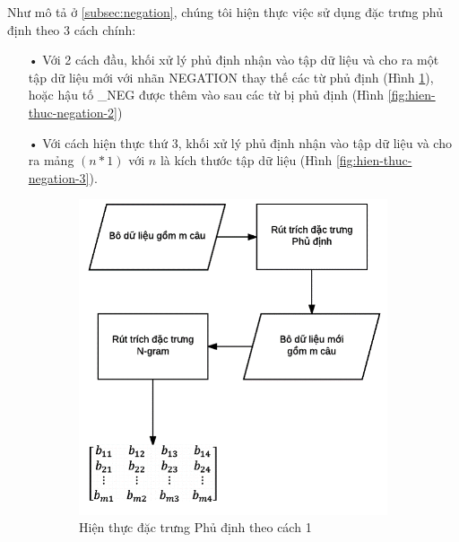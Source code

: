 Như mô tả ở \ref{subsec:negation}, chúng tôi hiện thực việc sử dụng đặc trưng phủ định theo 3 cách chính:
\begin{itemize}
\item[•] Với 2 cách đầu, khối xử lý phủ định nhận vào tập dữ liệu và cho ra một tập dữ liệu mới với nhãn NEGATION thay thế các từ phủ định (Hình \ref{fig:hien-thuc-negation-1}), hoặc hậu tố \_NEG được thêm vào sau các từ bị phủ định (Hình \ref{fig:hien-thuc-negation-2})
\item[•] Với cách hiện thực thứ 3, khối xử lý phủ định nhận vào tập dữ liệu và cho ra mảng $(n*1)$ với $n$ là kích thước tập dữ liệu (Hình \ref{fig:hien-thuc-negation-3}).
\end{itemize}
\begin{figure}
\begin{subfigure}{0.33\textwidth}
\centering
\includegraphics[scale=0.3]{../hinh/hien_thuc_negation.png}
\caption{Hiện thực đặc trưng Phủ định theo cách 1} \label{fig:hien-thuc-negation-1}
\end{subfigure}
~
\begin{subfigure}{0.3\textwidth}
\centering

\end{subfigure}
\end{figure}
